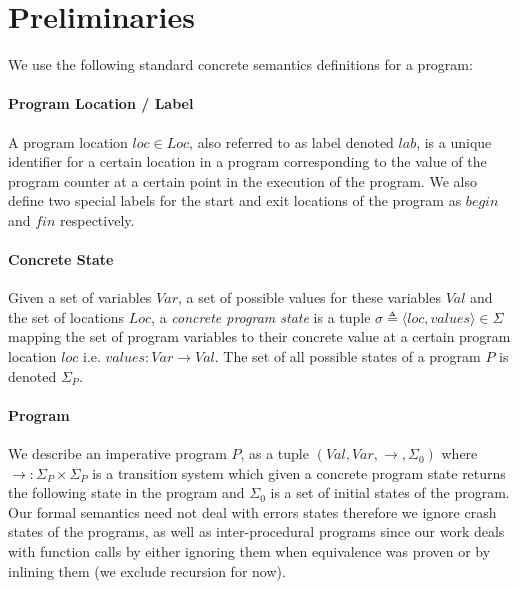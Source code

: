 \section{Preliminaries} 
We use the following standard concrete semantics definitions for a program:

\paragraph{Program Location / Label} 
A program location $loc \in Loc$, also referred to as label denoted $lab$, is a unique identifier for a certain location in a program corresponding to the value of the program counter at a certain point in the execution of the program. We also define two special labels for the start and exit locations of the program as $begin$ and $fin$ respectively.

\paragraph{Concrete State} 
Given a set of variables $Var$, a set of possible values for these variables $Val$ and the set of locations $Loc$, a \emph{concrete program state} is a tuple $\sigma \triangleq \langle loc, values \rangle \in \Sigma$ mapping the set of program variables to their concrete value at a certain program location $loc$ i.e. $values : Var \rightarrow Val$. The set of all possible states of a program $P$ is denoted $\Sigma_{P}$.

\paragraph{Program} 
We describe an imperative program $P$, as a tuple $(Val,Var,\rightarrow,\Sigma_{0})$ where $\rightarrow : \Sigma_{P} \times \Sigma_{P} $  is a transition system which given a concrete program state returns the following state in the program and $\Sigma_{0}$ is a set of initial states of the program. Our formal semantics need not deal with errors states therefore we ignore crash states of the programs, as well as inter-procedural programs since our work deals with function calls by either ignoring them when equivalence was proven or by inlining them (we exclude recursion for now).


